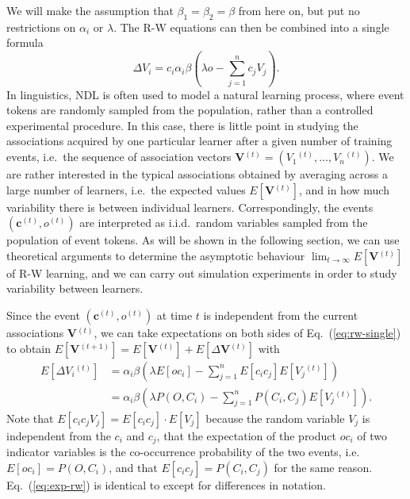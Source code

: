 \documentclass[conference]{IEEEtran}
\newcommand{\psup}[1]{\ensuremath{^{(#1)}}}
\newcommand{\psupt}{\psup{t}}
\begin{document}
We will make the assumption that $\beta_1 = \beta_2 = \beta$ from here on, but put no restrictions on $\alpha_i$ or $\lambda$.  The R-W equations can then be combined into a single formula
\begin{equation}
  \label{eq:rw-single}
  \Delta V_i = c_i \alpha_i \beta \left( \lambda o - \sum_{j=1}^n c_j V_j \right) .
\end{equation}
In linguistics, NDL is often used to model a natural learning process, where event tokens are randomly sampled from the population, rather than a controlled experimental procedure.  In this case, there is little point in studying the associations acquired by one particular learner after a given number of training events, i.e.\ the sequence of association vectors $\mathbf{V}\psupt = (V_1\psupt, \ldots, V_n\psupt)$.  We are rather interested in the typical associations obtained by averaging across a large number of learners, i.e.\ the expected values $E[\mathbf{V}\psupt]$, and in how much variability there is between individual learners.  Correspondingly, the events $(\mathbf{c}\psupt, o\psupt)$ are interpreted as i.i.d.\ random variables sampled from the population of event tokens.  As will be shown in the following section, we can use theoretical arguments to determine the asymptotic behaviour $\lim_{t\to \infty} E[\mathbf{V}\psupt]$ of R-W learning, and we can carry out simulation experiments in order to study variability between learners.

Since the event $(\mathbf{c}\psupt, o\psupt)$ at time $t$ is independent from the current associations $\mathbf{V}\psupt$, we can take expectations on both sides of Eq.~(\ref{eq:rw-single}) to obtain $E[\mathbf{V}\psup{t+1}] = E[\mathbf{V}\psupt] + E[\Delta \mathbf{V}\psupt]$ with
\begin{equation}
  \label{eq:exp-rw}
  \begin{split}
    E[\Delta V_i\psupt]
    &= \alpha_i\beta \left( \lambda E[o c_i] - \sum_{j=1}^n E[c_i c_j] E[V_j\psupt] \right) \\
    &= \alpha_i\beta \left( \lambda P(O, C_i) - \sum_{j=1}^n P(C_i, C_j) E[V_j\psupt] \right) .
  \end{split}
\end{equation}
Note that $E[c_i c_j V_j] = E[c_i c_j]\cdot E[V_j]$ because the random variable $V_j$ is independent from the $c_i$ and $c_j$, that the expectation of the product $o c_i$ of two indicator variables is the co-occurrence probability of the two events, i.e.\ $E[o c_i] = P(O, C_i)$, and that $E[c_i c_j] = P(C_i, C_j)$ for the same reason.  Eq.~(\ref{eq:exp-rw}) is identical to \cite[Eq.~(A-5)]{gluckbower1988} except for differences in notation.
\end{document}
